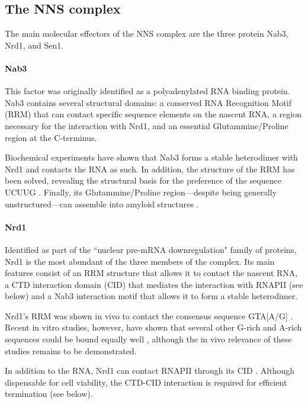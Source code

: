 \subsection{The NNS complex}

The main molecular effectors of the NNS complex are the three protein Nab3, Nrd1, and Sen1.


\paragraph{Nab3}

This factor was originally identified as a polyadenylated RNA binding protein. 
Nab3 contains several structural domains: a conserved RNA Recognition Motif (RRM) that can contact specific sequence elements on the nascent RNA, a region necessary for the interaction with Nrd1, and an essential Glutammine/Proline region at the C-terminus.

Biochemical experiments have shown that Nab3 forms a stable heterodimer with Nrd1 and contacts the RNA as such\cite{conrad:2000:yeast}. 
In addition, the structure of the RRM has been solved, revealing the structural basis for the preference of the sequence UCUUG \cite{lunde:2011:structural}. 
Finally, its Glutammine/Proline region---despite being generally unstructured---can assemble into amyloid structures \cite{orourke:2015:amyloidlike}.


\paragraph{Nrd1}

Identified as part of the ``nuclear pre-mRNA downregulation" family of proteins, Nrd1 is the most abundant of the three members of the complex. 
Its main features consist of an RRM structure that allows it to contact the nascent RNA, a CTD interaction domain (CID) that mediates the interaction with RNAPII (see below) and a Nab3 interaction motif that allows it to form a stable heterodimer.

Nrd1's RRM was shown in vivo to contact the consensus sequence GTA[A/G] \cite{steinmetz:1998:control}. 
Recent in vitro studies, however, have shown that several other G-rich and A-rich sequences could be bound equally well \citep{bacikova:2014:structure}, although the in vivo relevance of these studies remains to be demonstrated. 

In addition to the RNA, Nrd1 can contact RNAPII through its CID \cite{kubicek:2012:serine,vasiljeva:2008:nrd1nab3sen1}. 
Although dispensable for cell viability, the CTD-CID interaction is required for efficient termination (see below).

